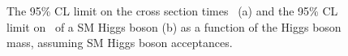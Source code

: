 \begin{figure}
  \begin{center}

 \caption{The 95\% \ac{CL} limit on the cross section times \BRinv\, (a) and the 95\% \ac{CL} limit on \BRinv\, of a SM Higgs boson (b) as a function of the Higgs boson mass, assuming SM Higgs boson acceptances.}
    \label{fig:parkedlimits}
  \end{center}
\end{figure}

